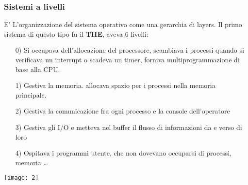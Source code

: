 \documentclass{article}
\begin{document}
\subsubsection{Sistemi a livelli}
E’ L’organizzazione del sistema operativo come una gerarchia di layers. Il primo sistema di questo tipo fu il \textbf{THE}, aveva 6 livelli:
\begin{enumerate}
   \item[0)] Si occupava dell’allocazione del processore, scambiava i processi quando si verificava un interrupt o scadeva un timer, forniva multiprogrammazione di base alla CPU.
   \item[1)] Gestiva la memoria. allocava spazio per i processi nella memoria principale.
   \item[2)] Gestiva la comunicazione fra ogni processo e la console dell’operatore
   \item[3)] Gestiva gli I/O e metteva nel buffer il flusso di informazioni da e verso di loro 
   \item[4)] Ospitava i programmi utente, che non dovevano occuparsi di processi, memoria …
\end{enumerate}
\texttt{[image: 2]}
\end{document}
